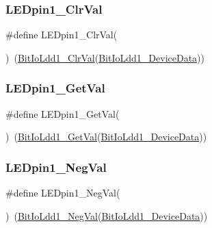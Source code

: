 \subsubsection{\texorpdfstring{L\+E\+Dpin1\+\_\+\+Clr\+Val}{LEDpin1\_ClrVal}}
{\footnotesize\ttfamily \#define L\+E\+Dpin1\+\_\+\+Clr\+Val(\begin{DoxyParamCaption}{ }\end{DoxyParamCaption})~(\hyperlink{group___bit_io_ldd1__module_ga85c0f352eded8016d2e47bf13c10e14c}{Bit\+Io\+Ldd1\+\_\+\+Clr\+Val}(\hyperlink{group___bit_io_ldd1__module_ga87620b3d6d232d352b6cd29d865efc18}{Bit\+Io\+Ldd1\+\_\+\+Device\+Data}))}

\mbox{\label{group___l_e_dpin1__module_ga452621fabd51a8ab50951b9d318dff24}} 
\subsubsection{\texorpdfstring{L\+E\+Dpin1\+\_\+\+Get\+Val}{LEDpin1\_GetVal}}
{\footnotesize\ttfamily \#define L\+E\+Dpin1\+\_\+\+Get\+Val(\begin{DoxyParamCaption}{ }\end{DoxyParamCaption})~(\hyperlink{group___bit_io_ldd1__module_gab3360cb6abf61e5983bee6a39f337789}{Bit\+Io\+Ldd1\+\_\+\+Get\+Val}(\hyperlink{group___bit_io_ldd1__module_ga87620b3d6d232d352b6cd29d865efc18}{Bit\+Io\+Ldd1\+\_\+\+Device\+Data}))}

\mbox{\label{group___l_e_dpin1__module_ga3efa3c36897f65f865e2b08cf6e205c4}} 
\subsubsection{\texorpdfstring{L\+E\+Dpin1\+\_\+\+Neg\+Val}{LEDpin1\_NegVal}}
{\footnotesize\ttfamily \#define L\+E\+Dpin1\+\_\+\+Neg\+Val(\begin{DoxyParamCaption}{ }\end{DoxyParamCaption})~(\hyperlink{group___bit_io_ldd1__module_ga6e66b99e22798dceaadbfffe984ce5d3}{Bit\+Io\+Ldd1\+\_\+\+Neg\+Val}(\hyperlink{group___bit_io_ldd1__module_ga87620b3d6d232d352b6cd29d865efc18}{Bit\+Io\+Ldd1\+\_\+\+Device\+Data}))}

